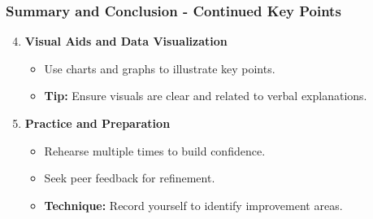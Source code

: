 \documentclass[aspectratio=169]{beamer}
\begin{document}
\begin{frame}[fragile]
    \frametitle{Summary and Conclusion - Continued Key Points}
    
    \begin{enumerate}
        \setcounter{enumi}{3} %
        
        \item \textbf{Visual Aids and Data Visualization}
            \begin{itemize}
                \item Use charts and graphs to illustrate key points.
                \item \textbf{Tip:} Ensure visuals are clear and related to verbal explanations.
            \end{itemize}
        
        \item \textbf{Practice and Preparation}
            \begin{itemize}
                \item Rehearse multiple times to build confidence.
                \item Seek peer feedback for refinement.
                \item \textbf{Technique:} Record yourself to identify improvement areas.
            \end{itemize}
    \end{enumerate}
\end{frame}
\end{document}
